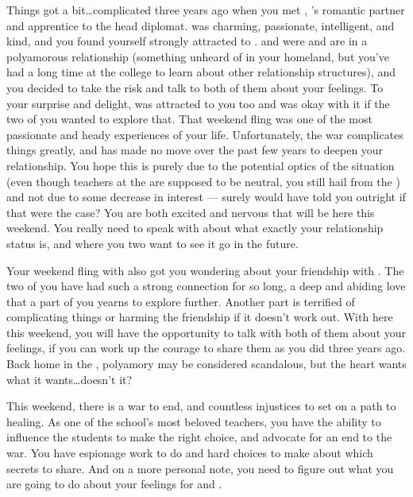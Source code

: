 \documentclass[char]{GL2020}
\begin{document}
Things got a bit\ldots complicated three years ago when you met \cJuniorStatesman{\full}, \cBeetle{}’s romantic partner and apprentice to the head \pShippie{} diplomat. \cJuniorStatesman{} was charming, passionate, intelligent, and kind, and you found yourself strongly attracted to \cJuniorStatesman{\them}. \cJuniorStatesman{} and \cBeetle{} were and are in a polyamorous relationship (something unheard of in your homeland, but you’ve had a long time at the college to learn about other relationship structures), and you decided to take the risk and talk to both of them about your feelings. To your surprise and delight, \cJuniorStatesman{} was attracted to you too and \cBeetle{} was okay with it if the two of you wanted to explore that. That weekend fling was one of the most passionate and heady experiences of your life. Unfortunately, the war complicates things greatly, and \cJuniorStatesman{} has made no move over the past few years to deepen your relationship. You hope this is purely due to the potential optics of the situation (even though teachers at the \pSc{} are supposed to be neutral, you still hail from the \pTech{}) and not due to some decrease in interest — surely \cJuniorStatesman{} would have told you outright if that were the case? You are both excited and nervous that \cJuniorStatesman{} will be here this weekend. You really need to speak with \cJuniorStatesman{\them} about what exactly your relationship status is, and where you two want to see it go in the future.

Your weekend fling with \cJuniorStatesman{} also got you wondering about your friendship with \cBeetle{}. The two of you have had such a strong connection for so long, a deep and abiding love that a part of you yearns to explore further. Another part is terrified of complicating things or harming the friendship if it doesn’t work out. With \cJuniorStatesman{} here this weekend, you will have the opportunity to talk with both of them about your feelings, if you can work up the courage to share them as you did three years ago. Back home in the \pTech{}, polyamory may be considered scandalous, but the heart wants what it wants…doesn’t it?

This weekend, there is a war to end, and countless injustices to set on a path to healing. As one of the school's most beloved teachers, you have the ability to influence the students to make the right choice, and advocate for an end to the war. You have espionage work to do and hard choices to make about which secrets to share. And on a more personal note, you need to figure out what you are going to do about your feelings for \cJuniorStatesman{} and \cBeetle{}.
\end{document}
